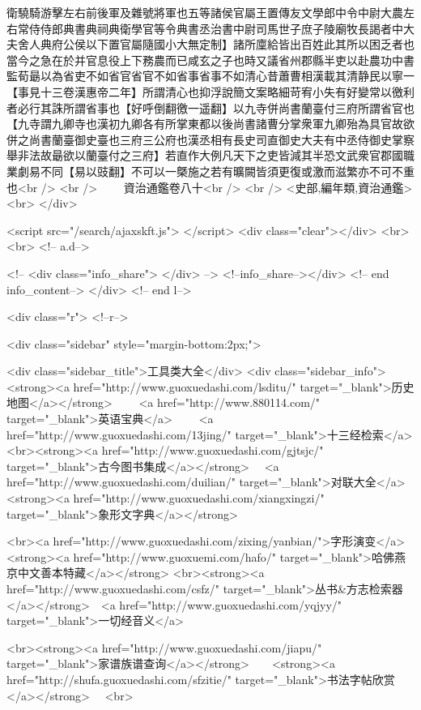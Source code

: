 衛驍騎游擊左右前後軍及雜號將軍也五等諸侯官屬王置傳友文學郎中令中尉大農左右常侍侍郎典書典祠典衛學官等令典書丞治書中尉司馬世子庶子陵廟牧長謁者中大夫舍人典府公侯以下置官屬隨國小大無定制】諸所廩給皆出百姓此其所以困乏者也當今之急在於并官息役上下務農而已咸玄之子也時又議省州郡縣半吏以赴農功中書監荀朂以為省吏不如省官省官不如省事省事不如清心昔蕭曹相漢載其清静民以寧一【事見十三卷漢惠帝二年】所謂清心也抑浮說簡文案略細苛宥小失有好變常以徼利者必行其誅所謂省事也【好呼倒翻徼一遥翻】以九寺併尚書蘭臺付三府所謂省官也【九寺謂九卿寺也漢初九卿各有所掌東都以後尚書諸曹分掌衆軍九卿殆為具官故欲併之尚書蘭臺御史臺也三府三公府也漢丞相有長史司直御史大夫有中丞侍御史掌察舉非法故朂欲以蘭臺付之三府】若直作大例凡天下之吏皆減其半恐文武衆官郡國職業劇易不同【易以豉翻】不可以一槩施之若有曠闕皆須更復或激而滋繁亦不可不重也<br />
<br />
　　資治通鑑卷八十<br />
<br />
<史部,編年類,資治通鑑>  <br>
   </div> 

<script src="/search/ajaxskft.js"> </script>
 <div class="clear"></div>
<br>
<br>
 <!-- a.d-->

 <!--
<div class="info_share">
</div> 
-->
 <!--info_share--></div>   <!-- end info_content-->
  </div> <!-- end l-->

<div class="r">   <!--r-->



<div class="sidebar"  style="margin-bottom:2px;">

 
<div class="sidebar_title">工具类大全</div>
<div class="sidebar_info">
<strong><a href="http://www.guoxuedashi.com/lsditu/" target="_blank">历史地图</a></strong>　　
<a href="http://www.880114.com/" target="_blank">英语宝典</a>　　
<a href="http://www.guoxuedashi.com/13jing/" target="_blank">十三经检索</a>　
<br><strong><a href="http://www.guoxuedashi.com/gjtsjc/" target="_blank">古今图书集成</a></strong>　
<a href="http://www.guoxuedashi.com/duilian/" target="_blank">对联大全</a>　<strong><a href="http://www.guoxuedashi.com/xiangxingzi/" target="_blank">象形文字典</a></strong>　

<br><a href="http://www.guoxuedashi.com/zixing/yanbian/">字形演变</a>　　<strong><a href="http://www.guoxuemi.com/hafo/" target="_blank">哈佛燕京中文善本特藏</a></strong>
<br><strong><a href="http://www.guoxuedashi.com/csfz/" target="_blank">丛书&方志检索器</a></strong>　<a href="http://www.guoxuedashi.com/yqjyy/" target="_blank">一切经音义</a>　　

<br><strong><a href="http://www.guoxuedashi.com/jiapu/" target="_blank">家谱族谱查询</a></strong>　　<strong><a href="http://shufa.guoxuedashi.com/sfzitie/" target="_blank">书法字帖欣赏</a></strong>　
<br>

